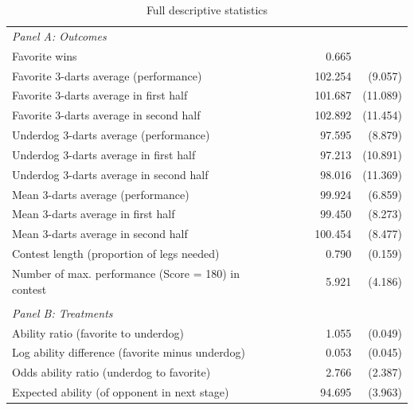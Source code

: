 \documentclass[11pt,a4paper]{article}
\begin{document}
	\begin{table}[H]
		\centering
		\caption{Full descriptive statistics} 
		\label{tab:table_app_desc}
		\begin{tabular}{l r r r} 
			\toprule \toprule

            \multicolumn{4}{l}{\textit{Panel A: Outcomes}} \vspace{0.7em}            \\ 
			Favorite wins                                & ~~~~ &  0.665 &           \\
		    Favorite 3-darts average (performance)       & &  102.254    & (9.057)   \\
		    Favorite 3-darts average in first half       & &  101.687    & (11.089)  \\
		    Favorite 3-darts average in second half      & &  102.892    & (11.454)  \\
		    Underdog 3-darts average (performance)       & &  97.595     & (8.879)   \\
		    Underdog 3-darts average in first half       & &  97.213     & (10.891)  \\
		    Underdog 3-darts average in second half      & &  98.016     & (11.369)  \\ 
		    Mean 3-darts average (performance)           & &  99.924     & (6.859)   \\ 
		    Mean 3-darts average in first half           & &  99.450     & (8.273)   \\ 
      		Mean 3-darts average in second half          & &  100.454    & (8.477)   \\
            Contest length (proportion of legs needed)   & &  0.790      & (0.159)   \\
            Number of max. performance (Score = 180) in contest & & 5.921 & (4.186)  \\ 
            \vspace{-0.5em}  \\
            \multicolumn{4}{l}{\textit{Panel B: Treatments}} \vspace{0.7em} \\ 
			Ability ratio (favorite to underdog)             & &   1.055     & (0.049)   \\
			Log ability difference (favorite minus underdog) & &   0.053     & (0.045)   \\
            Odds ability ratio (underdog to favorite)        & &   2.766     &  (2.387)  \\
            Expected ability (of opponent in next stage)     & &  94.695     & (3.963)   \\

\end{tabular}
\end{table}
\end{document}
